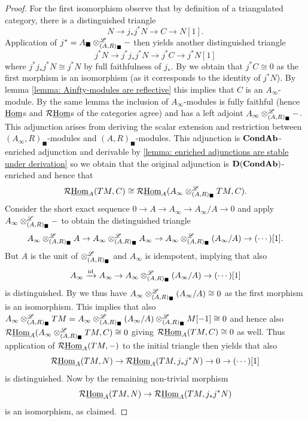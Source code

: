 \begin{proof}
	For the first isomorphism observe that by definition of a triangulated category, there is a distinguished triangle
	$$N \to j_\ast j^\ast N \to C \to N[1].$$
	Application of $j^\ast = A_\blacksquare\otimes^{\mathscr{L}}_{(A, R)_\blacksquare} -$ then yields another distinguished triangle
		$$j^\ast N\to j^\ast j_\ast j^\ast N \to j^\ast C \to j^\ast N[1]$$
	where $j^\ast j_\ast j^\ast N \cong j^\ast N$ by full faithfulness of $j_\ast$. By \cite[\href{https://stacks.math.columbia.edu/tag/05QR}{Tag 05QR}]{stacks-project} we obtain that $j^\ast C \cong 0$ as the first morphism is an isomorphism (as it corresponds to the identity of $j^\ast N$). By lemma \ref{lemma: Ainfty-modules are reflective} this implies that $C$ is an $A_\infty$-module. By the same lemma the inclusion of $A_\infty$-modules is fully faithful (hence ${\underline{\operatorname{Hom}}}$s and $\mathcal{R}{\underline{\operatorname{Hom}}}$s of the categories agree) and has a left adjoint $A_\infty\otimes^{\mathscr{L}}_{(A, R)_\blacksquare} -$. This adjunction arises from deriving the scalar extension and restriction between $(A_\infty, R)_\blacksquare$-modules and $(A, R)_\blacksquare$-modules. This adjunction is ${{{\mathbf{Cond}}}{{\mathbf{Ab}}}}$-enriched adjunction and derivable by \ref{lemma: enriched adjunctions are stable under derivation} so we obtain that the original adjunction is ${{\mathbf{D}}({{{\mathbf{Cond}}}{{\mathbf{Ab}}}})}$-enriched and hence that
		$$\mathcal{R}{\underline{\operatorname{Hom}}}_A(TM, C) \cong \mathcal{R}{\underline{\operatorname{Hom}}}_A(A_\infty\otimes^{\mathscr{L}}_{(A, R)_\blacksquare} TM, C).$$
	Consider the short exact sequence $0\to A\to A_\infty\to A_\infty/A \to 0$ and apply $A_\infty\otimes^{\mathscr{L}}_{(A, R)_\blacksquare} -$ to obtain the distinguished triangle
		$$A_\infty\otimes^{\mathscr{L}}_{(A, R)_\blacksquare} A \to A_\infty\otimes^{\mathscr{L}}_{(A, R)_\blacksquare}A_\infty \to A_\infty\otimes^{\mathscr{L}}_{(A, R)_\blacksquare} (A_\infty/A) \to (\cdots)[1].$$
	But $A$ is the unit of $\otimes^{\mathscr{L}}_{(A, R)_\blacksquare}$ and $A_\infty$ is idempotent, implying that also
	$$A_\infty\xrightarrow{\mathrm{id}} A_\infty \to A_\infty\otimes^{\mathscr{L}}_{(A, R)_\blacksquare} (A_\infty/A) \to (\cdots)[1]$$
	is distinguished. By \cite[\href{https://stacks.math.columbia.edu/tag/05QR}{Tag 05QR}]{stacks-project} we thus have $A_\infty\otimes^{\mathscr{L}}_{(A, R)_\blacksquare} (A_\infty/A)\cong 0$ as the first morphism is an isomorphism. This implies that also $A_\infty\otimes^{\mathscr{L}}_{(A, R)_\blacksquare} TM = A_\infty\otimes^{\mathscr{L}}_{(A, R)_\blacksquare} (A_\infty/A) \otimes^{\mathscr{L}}_{(A, R)_\blacksquare} M[-1] \cong 0$ and hence also $\mathcal{R}{\underline{\operatorname{Hom}}}_A(A_\infty\otimes^{\mathscr{L}}_{(A, R)_\blacksquare} T M, C) \cong 0$ giving $\mathcal{R}{\underline{\operatorname{Hom}}}_A(TM, C) \cong 0$ as well. Thus application of $\mathcal{R}{\underline{\operatorname{Hom}}}_A(TM, -)$ to the initial triangle then yields that also
		$$\mathcal{R}{\underline{\operatorname{Hom}}}_A(TM, N)\to\mathcal{R}{\underline{\operatorname{Hom}}}_A(TM, j_\ast j^\ast N) \to 0 \to (\cdots)[1]$$
	is distinguished. Now by \cite[\href{https://stacks.math.columbia.edu/tag/05QR}{Tag 05QR}]{stacks-project} the remaining non-trivial morphism
		$$\mathcal{R}{\underline{\operatorname{Hom}}}_A(TM, N)\to\mathcal{R}{\underline{\operatorname{Hom}}}_A(TM, j_\ast j^\ast N)$$
	is an isomorphism, as claimed.
	

\end{proof}
